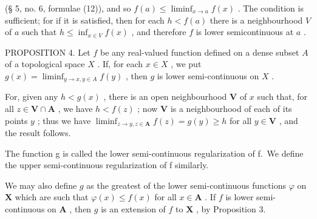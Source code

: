 (§ 5, no. 6, formulae (12)), and so \(f(a) \leqslant \liminf_{x \to a} f(x)\) . The condition is sufficient; for if it is satisfied, then for each \(h < f(a)\) there is a neighbourhood \(V\) of \(a\) such that \(h \leqslant \inf_{x \in V} f(x)\) , and therefore \(f\) is lower semicontinuous at \(a\) .

PROPOSITION 4. Let \(f\) be any real-valued function defined on a dense subset \(A\) of a topological space \(X\) . If, for each \(x \in X\) , we put \(g(x) = \liminf_{y \to x, y \in A} f(y)\) , then \(g\) is lower semi-continuous on \(X\) .

For, given any \(h < g(x)\) , there is an open neighbourhood \(\mathbf{V}\) of \(x\) such that, for all \(z \in \mathbf{V} \cap \mathbf{A}\) , we have \(h < f(z)\) ; now \(\mathbf{V}\) is a neighbourhood of each of its points \(y\) ; thus we have \(\liminf_{z \to y, z \in \mathbf{A}} f(z) = g(y) \geqslant h\) for all \(y \in \mathbf{V}\) , and the result follows.

The function g is called the lower semi-continuous regularization of f.~We define the upper semi-continuous regularization of f similarly.

We may also define \(g\) as the greatest of the lower semi-continuous functions \(\varphi\) on \(\mathbf{X}\) which are such that \(\varphi(x) \leqslant f(x)\) for all \(x \in \mathbf{A}\) . If \(f\) is lower semi-continuous on \(\mathbf{A}\) , then \(g\) is an extension of \(f\) to \(\mathbf{X}\) , by Proposition 3.

